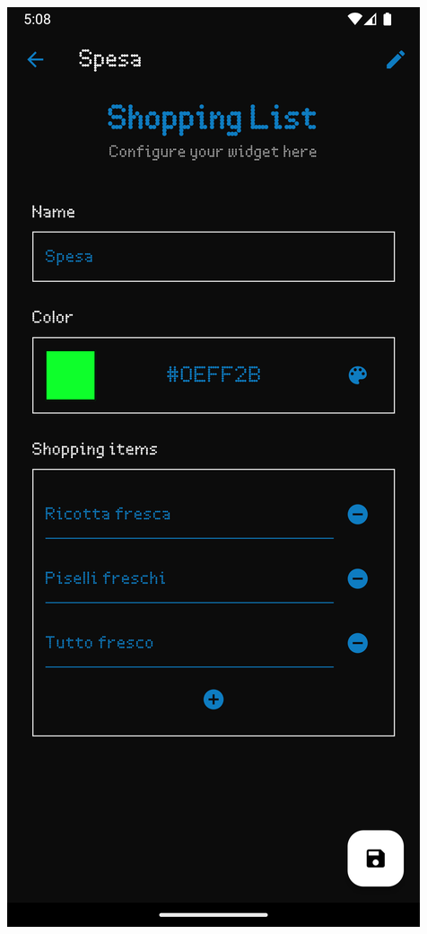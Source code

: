 \begin{minipage}{0.45\textwidth}
\centering
\includegraphics[width=\textwidth]{tesi/img/config_form/shopping_list_form.png}
\end{minipage}

